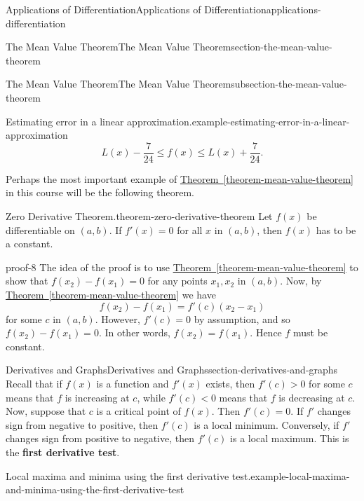 \documentclass[oneside,10pt,]{book}
\newcommand{\terminology}[1]{\textbf{#1}}
\numberwithin{equation}{section}
\begin{document}
\begin{chapterptx}{Applications of Differentiation}{}{Applications of Differentiation}{}{}{applications-differentiation}
\begin{sectionptx}{The Mean Value Theorem}{}{The Mean Value Theorem}{}{}{section-the-mean-value-theorem}
\begin{subsectionptx}{The Mean Value Theorem}{}{The Mean Value Theorem}{}{}{subsection-the-mean-value-theorem}
\begin{example}{Estimating error in a linear approximation.}{example-estimating-error-in-a-linear-approximation}
\begin{equation*}
L(x) - \frac{7}{24} \leq f(x) \leq L(x) + \frac{7}{24}.
\end{equation*}
%
\end{example}
\hypertarget{p-343}{}%
Perhaps the most important example of \hyperref[theorem-mean-value-theorem]{Theorem~\ref{theorem-mean-value-theorem}} in this course will be the following theorem.%
\begin{theorem}{Zero Derivative Theorem.}{}{theorem-zero-derivative-theorem}%
\hypertarget{p-344}{}%
Let \(f(x)\) be differentiable on \((a,b)\). If \(f'(x) = 0\) for all \(x\) in \((a,b)\), then \(f(x)\) has to be a constant.%
\end{theorem}
\begin{proofptx}{}{proof-8}
\hypertarget{p-345}{}%
The idea of the proof is to use \hyperref[theorem-mean-value-theorem]{Theorem~\ref{theorem-mean-value-theorem}} to show that \(f(x_{2}) - f(x_{1}) = 0\) for any points \(x_{1},x_{2}\) in \((a,b)\). Now, by \hyperref[theorem-mean-value-theorem]{Theorem~\ref{theorem-mean-value-theorem}} we have%
\begin{equation*}
f(x_{2}) - f(x_{1}) = f'(c)(x_{2}-x_{1})
\end{equation*}
for some \(c\) in \((a,b)\). However, \(f'(c) = 0\) by assumption, and so \(f(x_{2}) - f(x_{1}) = 0\). In other words, \(f(x_{2}) = f(x_{1})\). Hence \(f\) must be constant.%
\end{proofptx}
\end{subsectionptx}
\end{sectionptx}
%
%
\typeout{************************************************}
\typeout{************************************************}
%
\begin{sectionptx}{Derivatives and Graphs}{}{Derivatives and Graphs}{}{}{section-derivatives-and-graphs}
\hypertarget{p-346}{}%
Recall that if \(f(x)\) is a function and \(f'(x)\) exists, then \(f'(c) > 0\) for some \(c\) means that \(f\) is increasing at \(c\), while \(f'(c) < 0\) means that \(f\) is decreasing at \(c\). Now, suppose that \(c\) is a critical point of \(f(x)\). Then \(f'(c) = 0\). If \(f'\) changes sign from negative to positive, then \(f'(c)\) is a local minimum. Conversely, if \(f'\) changes sign from positive to negative, then \(f'(c)\) is a local maximum. This is the \terminology{first derivative test}.%
\begin{example}{Local maxima and minima using the first derivative test.}{example-local-maxima-and-minima-using-the-first-derivative-test}%
\hypertarget{p-347}{}%

\end{example}
\end{sectionptx}
\end{chapterptx}
\end{document}

